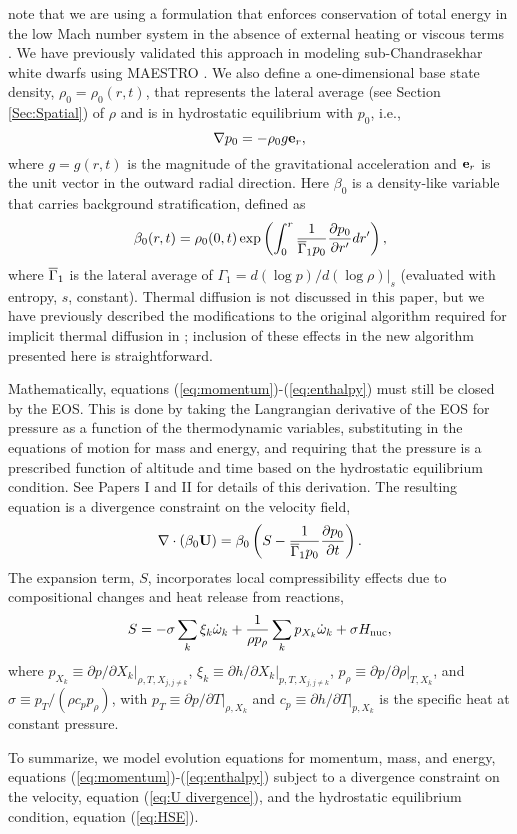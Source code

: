 note that we are using a formulation that enforces conservation of total energy in the 
low Mach number system in the absence of external heating or viscous terms \citep{kleinpauluis,Vasil2013}.
We have previously validated this approach in modeling sub-Chandrasekhar white dwarfs using MAESTRO \citep{subChandra_II}. 
We also define a one-dimensional base state density, $\rho_0 = \rho_0(r,t)$, that represents the lateral average (see Section \ref{Sec:Spatial}) of $\rho$ and is in hydrostatic equilibrium with $p_0$, i.e., 
\begin{equation}
\nabla p_0 = -\rho_0 g\eb_r, \label{eq:HSE}
\end{equation}
where $g=g(r,t)$ is the magnitude of the gravitational acceleration and ${\bf{e}}_r$ is the unit vector in the outward radial direction. 
Here $\beta_0$ is a density-like variable that carries background stratification, defined as
\begin{equation}
\beta_0(r,t) = \rho_0(0,t)\exp\left(\int_0^r\frac{1}{\gammaonebar p_0}\frac{\partial p_0}{\partial r'}dr'\right),
\end{equation}
where $\overline{\Gamma}_1$ is the lateral average of $\Gamma_1 = d(\log p)/d(\log\rho) |_s$ (evaluated with entropy, $s$, constant).
Thermal diffusion is not discussed in this paper, but we have previously described the modifications to the original algorithm required 
for implicit thermal diffusion in \cite{XRB_I}; inclusion of these effects in the new algorithm presented here is straightforward.

Mathematically, equations (\ref{eq:momentum})-(\ref{eq:enthalpy}) must still be closed by the EOS.  
This is done by taking the Langrangian derivative of the EOS for pressure as a function of the thermodynamic variables, 
substituting in the equations of motion for mass and energy,
and requiring that the pressure is a prescribed function of altitude and time based on the hydrostatic equilibrium condition.
See Papers I and II for details of this derivation.
The resulting equation is a divergence constraint on the velocity field,
\begin{equation}
\nabla\cdot(\beta_0\Ub) = \beta_0\left(S - \frac{1}{\gammaonebar p_0}\frac{\partial p_0}{\partial t}\right).\label{eq:U divergence}
\end{equation}
The expansion term, $S$, incorporates local compressibility effects due to compositional changes and heat release from reactions,
\begin{equation}
S = -\sigma\sum_k\xi_k\omegadot_k + \frac{1}{\rho p_\rho}\sum_k p_{X_k}\omegadot_k + \sigma\Hnuc,\label{eq:S}
\end{equation}
where 
$p_{X_k} \equiv \left. \partial p / \partial X_k \right|_{\rho,T,X_{j,j\ne k}}$, 
$\xi_k \equiv \left. \partial h /\partial X_k \right |_{p,T,X_{j,j\ne k}}$,
$p_\rho \equiv \left.\partial p/\partial \rho \right |_{T, X_k}$, and 
$\sigma \equiv p_T/(\rho c_p p_\rho)$, with $p_T \equiv \left. \partial p / \partial
T \right|_{\rho, X_k}$ and $c_p \equiv \left.  \partial h / \partial T
\right|_{p,X_k}$ is the specific heat at constant pressure.

To summarize, we model evolution equations for momentum, mass, and energy, equations (\ref{eq:momentum})-(\ref{eq:enthalpy}) subject to a divergence constraint on the velocity, equation (\ref{eq:U divergence}), and the hydrostatic equilibrium condition, equation (\ref{eq:HSE}).
